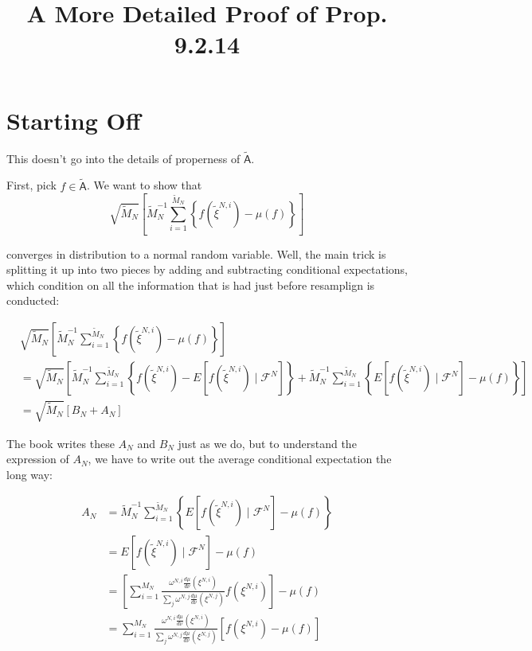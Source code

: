 \documentclass{article}
\title{A More Detailed Proof of Prop. 9.2.14}
\begin{document}
\maketitle

\section{Starting Off}


This doesn't go into the details of properness of $\tilde{\mathsf{A}}$.


First, pick $f\in \tilde{\mathsf{A}}$. We want to show that 
$$
\sqrt{\tilde{M}_N} \left[ \tilde{M}_N^{-1}\sum_{i=1}^{\tilde{M}_N} \left\{  f(\tilde{\xi}^{N,i}) - \mu(f) \right\}    \right]
$$

converges in distribution to a normal random variable. Well, the main trick is splitting it up into two pieces by adding and subtracting conditional expectations, which condition on all the information that is had just before resamplign is conducted:

\begin{align*}
&\sqrt{\tilde{M}_N} \left[ \tilde{M}_N^{-1}\sum_{i=1}^{\tilde{M}_N} \left\{  f(\tilde{\xi}^{N,i}) - \mu(f) \right\}    \right] \\
&= \sqrt{\tilde{M}_N} \left[ \tilde{M}_N^{-1} \sum_{i=1}^{\tilde{M}_N} \left\{  f(\tilde{\xi}^{N,i}) - E[f(\tilde{\xi}^{N,i}) \mid \mathcal{F}^N] \right\} + \tilde{M}_N^{-1}\sum_{i=1}^{\tilde{M}_N} \left\{  E[f(\tilde{\xi}^{N,i}) \mid \mathcal{F}^N] - \mu(f) \right\}    \right] \\
&= \sqrt{\tilde{M}_N} \left[ B_N + A_N    \right]
\end{align*}

The book writes these $A_N$ and $B_N$ just as we do, but to understand the expression of $A_N$, we have to write out the average conditional expectation the long way:

\begin{align*}
A_N &= \tilde{M}_N^{-1}\sum_{i=1}^{\tilde{M}_N} \left\{  E[f(\tilde{\xi}^{N,i}) \mid \mathcal{F}^N] - \mu(f) \right\} \\
&=   E[f(\tilde{\xi}^{N,i}) \mid \mathcal{F}^N] - \mu(f) \tag{identicalness}\\
&= \left[ \sum_{i=1}^{M_N} \frac{ \omega^{N,i} \frac{d\mu}{d\nu}(\xi^{N,i})  }{ \sum_j \omega^{N,j} \frac{d\mu}{d\nu}(\xi^{N,j})} f(\xi^{N,i}) \right] - \mu(f) \\
&=  \sum_{i=1}^{M_N}  \frac{ \omega^{N,i} \frac{d\mu}{d\nu}(\xi^{N,i})  }{ \sum_j \omega^{N,j} \frac{d\mu}{d\nu}(\xi^{N,j})} \left[f(\xi^{N,i})  - \mu(f) \right]
\end{align*}
\end{document}
